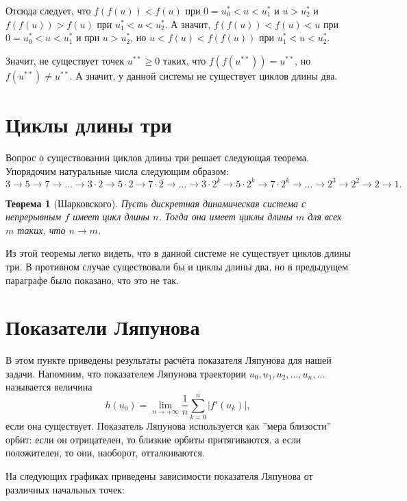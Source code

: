 \documentclass[11pt]{article}
\newtheorem{theorem}{Теорема}
\newcommand\abs[1]{\left\lvert#1\right\rvert}
\begin{document}
Отсюда следует, что $f(f(u)) < f(u)$ при $0 = u_0^* < u < u_1^*$ и $u > u_2^*$ и $f(f(u)) > f(u)$ при $u_1^* < u < u_2^*$. А значит, $f(f(u)) < f(u) < u$ при $0 = u_0^* < u < u_1^*$ и при $u > u_2^*$, но $u < f(u) < f(f(u))$ при $u_1^* < u < u_2^*$.

Значит, не существует точек $u^{**} \geqslant 0$ таких, что $f(f(u^{**})) = u^{**}$, но $f(u^{**}) \neq u^{**}$. А значит, у данной системы не существует циклов длины два.
\section{Циклы длины три}
Вопрос о существовании циклов длины три решает следующая теорема. Упорядочим натуральные числа следующим образом:
$$
3 \rightarrow 5 \rightarrow 7 \rightarrow \ldots \rightarrow 3 \cdot 2 \rightarrow 5 \cdot 2 \rightarrow 7 \cdot 2 \rightarrow \ldots \rightarrow 3 \cdot 2^k \rightarrow 5 \cdot 2^k \rightarrow 7 \cdot 2^k \rightarrow \ldots \rightarrow 2^3 \rightarrow 2^2 \rightarrow 2 \rightarrow 1.
$$
\begin{theorem}[Шарковского]
Пусть дискретная динамическая система с непрерывным $f$ имеет цикл длины $n$. Тогда она имеет циклы длины $m$ для всех $m$ таких, что $n \rightarrow m$.
\end{theorem}

Из этой теоремы легко видеть, что в данной системе не существует циклов длины три. В противном случае существовали бы и циклы длины два, но в предыдущем параграфе было показано, что это не так.
\section{Показатели Ляпунова}
В этом пункте приведены результаты расчёта показателя Ляпунова для нашей задачи. Напомним, что показателем Ляпунова траектории $u_0, u_1, u_2, \ldots, u_n, \ldots$ называется величина
$$
h(u_0) = \lim\limits_{n \rightarrow +\infty} \frac{1}{n} \sum\limits_{k = 0}^{n}\abs{f'(u_k)},
$$
если она существует. Показатель Ляпунова используется как ''мера близости'' орбит: если он отрицателен, то близкие орбиты притягиваются, а если положителен, то они, наоборот, отталкиваются.

На следующих графиках приведены зависимости показателя Ляпунова от различных начальных точек:
\end{document}
